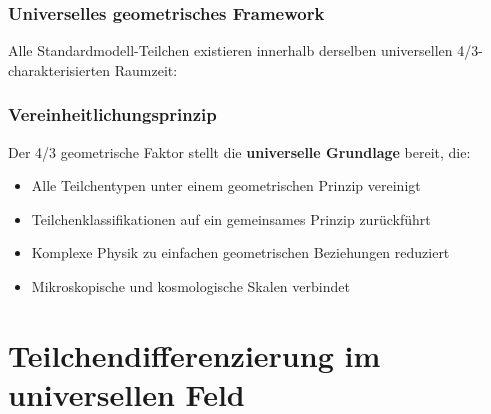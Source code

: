 	\subsubsection{Universelles geometrisches Framework}
	\label{subsubsec:universelles_framework}
	
	Alle Standardmodell-Teilchen existieren innerhalb derselben universellen 4/3-charakterisierten Raumzeit:
	
	\begin{table}[htbp]
		\centering
		\caption{Universelle 4/3 Geometrie für alle Teilchen}
		\label{tab:universelle_geometrie}
	\end{table}
	
	\subsubsection{Vereinheitlichungsprinzip}
	\label{subsubsec:vereinheitlichungsprinzip}
	
	Der 4/3 geometrische Faktor stellt die \textbf{universelle Grundlage} bereit, die:
	\begin{itemize}
		\item Alle Teilchentypen unter einem geometrischen Prinzip vereinigt
		\item Teilchenklassifikationen auf ein gemeinsames Prinzip zurückführt
		\item Komplexe Physik zu einfachen geometrischen Beziehungen reduziert
		\item Mikroskopische und kosmologische Skalen verbindet
	\end{itemize}
	
	\section{Teilchendifferenzierung im universellen Feld}
	\label{sec:teilchendifferenzierung}
	
